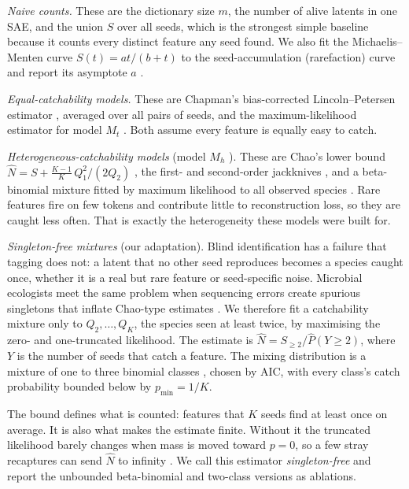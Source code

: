 \emph{Naive counts.} These are the dictionary size $m$, the number of alive latents in one SAE, and the union $S$ over all seeds, which is the strongest simple baseline because it counts every distinct feature any seed found. We also fit the Michaelis--Menten curve $S(t)=at/(b+t)$ to the seed-accumulation (rarefaction) curve and report its asymptote $a$ \citep{raaijmakers1987statistical,colwell2012models}.

\emph{Equal-catchability models.} These are Chapman's bias-corrected Lincoln--Petersen estimator \citep{chapman1951some}, averaged over all pairs of seeds, and the maximum-likelihood estimator for model $M_t$ \citep{darroch1958multiple}. Both assume every feature is equally easy to catch.

\emph{Heterogeneous-catchability models} (model $M_h$ \citep{otis1978statistical}). These are Chao's lower bound $\hat N=S+\tfrac{K-1}{K}\,Q_1^2/(2Q_2)$ \citep{chao1987estimating}, the first- and second-order jackknives \citep{burnham1978estimation}, and a beta-binomial mixture fitted by maximum likelihood to all observed species \citep{dorazio2003mixture}. Rare features fire on few tokens and contribute little to reconstruction loss, so they are caught less often. That is exactly the heterogeneity these models were built for.

\emph{Singleton-free mixtures} (our adaptation). Blind identification has a failure that tagging does not: a latent that no other seed reproduces becomes a species caught once, whether it is a real but rare feature or seed-specific noise. Microbial ecologists meet the same problem when sequencing errors create spurious singletons that inflate Chao-type estimates \citep{chiu2016estimating}. We therefore fit a catchability mixture only to $Q_2,\dots,Q_K$, the species seen at least twice, by maximising the zero- and one-truncated likelihood. The estimate is $\hat N=S_{\ge2}/\hat P(Y\ge2)$, where $Y$ is the number of seeds that catch a feature. The mixing distribution is a mixture of one to three binomial classes \citep{pledger2000unified}, chosen by AIC, with every class's catch probability bounded below by $p_{\min}=1/K$.

The bound defines what is counted: features that $K$ seeds find at least once on average. It is also what makes the estimate finite. Without it the truncated likelihood barely changes when mass is moved toward $p=0$, so a few stray recaptures can send $\hat N$ to infinity \citep{link2003nonidentifiability}. We call this estimator \emph{singleton-free} and report the unbounded beta-binomial and two-class versions as ablations.

